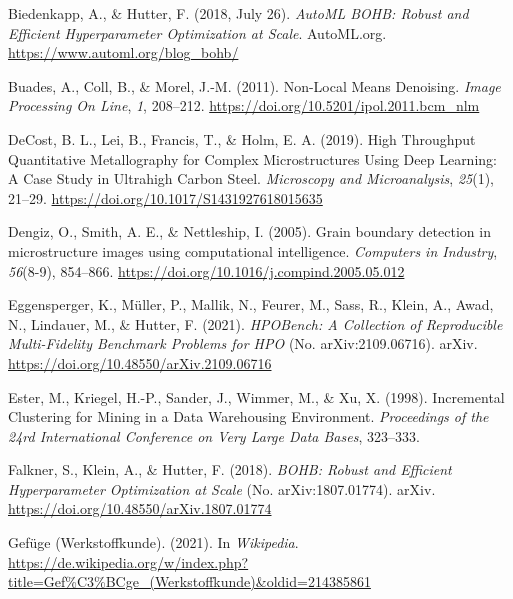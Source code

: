\documentclass[
  12pt,
  openany]{book}
\newlength{\cslhangindent}
\newlength{\cslentryspacingunit} %
\newenvironment{CSLReferences}[2] %
 {%
  \setlength{\parindent}{0pt}
  \ifodd #1
  \let\oldpar\par
  \def\par{\hangindent=\cslhangindent\oldpar}
  \fi
  \setlength{\parskip}{#2\cslentryspacingunit}
 }%
 {}
\begin{document}
\begin{CSLReferences}{1}{0}
\leavevmode{}%
Biedenkapp, A., \& Hutter, F. (2018, July 26). \emph{{AutoML} \textbar{} {BOHB}: {Robust} and {Efficient Hyperparameter Optimization} at {Scale}}. {AutoML.org}. \url{https://www.automl.org/blog_bohb/}

\leavevmode{}%
Buades, A., Coll, B., \& Morel, J.-M. (2011). Non-{Local Means Denoising}. \emph{Image Processing On Line}, \emph{1}, 208--212. \url{https://doi.org/10.5201/ipol.2011.bcm_nlm}

\leavevmode{}%
DeCost, B. L., Lei, B., Francis, T., \& Holm, E. A. (2019). High {Throughput Quantitative Metallography} for {Complex Microstructures Using Deep Learning}: {A Case Study} in {Ultrahigh Carbon Steel}. \emph{Microscopy and Microanalysis}, \emph{25}(1), 21--29. \url{https://doi.org/10.1017/S1431927618015635}

\leavevmode{}%
Dengiz, O., Smith, A. E., \& Nettleship, I. (2005). Grain boundary detection in microstructure images using computational intelligence. \emph{Computers in Industry}, \emph{56}(8-9), 854--866. \url{https://doi.org/10.1016/j.compind.2005.05.012}

\leavevmode{}%
Eggensperger, K., Müller, P., Mallik, N., Feurer, M., Sass, R., Klein, A., Awad, N., Lindauer, M., \& Hutter, F. (2021). \emph{{HPOBench}: {A Collection} of {Reproducible Multi-Fidelity Benchmark Problems} for {HPO}} (No. arXiv:2109.06716). {arXiv}. \url{https://doi.org/10.48550/arXiv.2109.06716}

\leavevmode{}%
Ester, M., Kriegel, H.-P., Sander, J., Wimmer, M., \& Xu, X. (1998). Incremental {Clustering} for {Mining} in a {Data Warehousing Environment}. \emph{Proceedings of the 24rd {International Conference} on {Very Large Data Bases}}, 323--333.

\leavevmode{}%
Falkner, S., Klein, A., \& Hutter, F. (2018). \emph{{BOHB}: {Robust} and {Efficient Hyperparameter Optimization} at {Scale}} (No. arXiv:1807.01774). {arXiv}. \url{https://doi.org/10.48550/arXiv.1807.01774}

\leavevmode{}%
Gefüge (Werkstoffkunde). (2021). In \emph{Wikipedia}. \url{https://de.wikipedia.org/w/index.php?title=Gef\%C3\%BCge_(Werkstoffkunde)\&oldid=214385861}


\end{CSLReferences}
\end{document}
